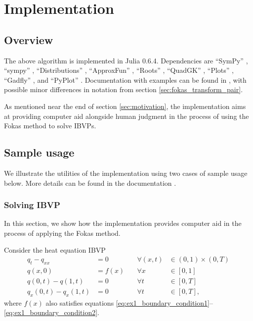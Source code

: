 \documentclass[12pt, oneside, a4paper]{article}
\begin{document}
\section{Implementation}
\subsection{Overview}
The above algorithm is implemented in Julia 0.6.4. Dependencies are ``SymPy'' \cite{sympy}, ``sympy'' \cite{sympyPython},  ``Distributions'' \cite{distributions}, ``ApproxFun'' \cite{approxfun}, ``Roots'' \cite{roots}, ``QuadGK'' \cite{quadgk}, ``Plots'' \cite{plots}, ``Gadfly'' \cite{gadfly}, and ``PyPlot'' \cite{pyplot}. Documentation with examples can be found in \cite{Xiao}, with possible minor differences in notation from section \ref{sec:fokas_transform_pair}.

As mentioned near the end of section \ref{sec:motivation}, the implementation aims at providing computer aid alongside human judgment in the process of using the Fokas method to solve IBVPs.

\subsection{Sample usage}
We illustrate the utilities of the implementation using two cases of sample usage below. More details can be found in the documentation \cite{Xiao}.

\subsubsection{Solving IBVP}\label{sec:ex1}
In this section, we show how the implementation provides computer aid in the process of applying the Fokas method.

Consider the heat equation IBVP
\begin{subequations}\label{eq:ex1}
    \begin{alignat}{3}
        q_t - q_{xx} &= 0\quad &\forall (x,t)&\in (0,1)\times (0,T) \label{eq:ex1_PDE}\\
        q(x,0) &= f(x) \quad &\forall x&\in [0,1]\label{eq:ex1_initial_condition}\\
        q(0,t) - q(1,t) &= 0 &\forall t&\in [0,T]\label{eq:ex1_boundary_condition1}\\
        q_x(0,t) - q_x(1,t) &= 0 &\forall t&\in [0,T]\label{eq:ex1_boundary_condition2},
    \end{alignat}
\end{subequations}
where $f(x)$ also satisfies equations \eqref{eq:ex1_boundary_condition1}--\eqref{eq:ex1_boundary_condition2}.
\end{document}
